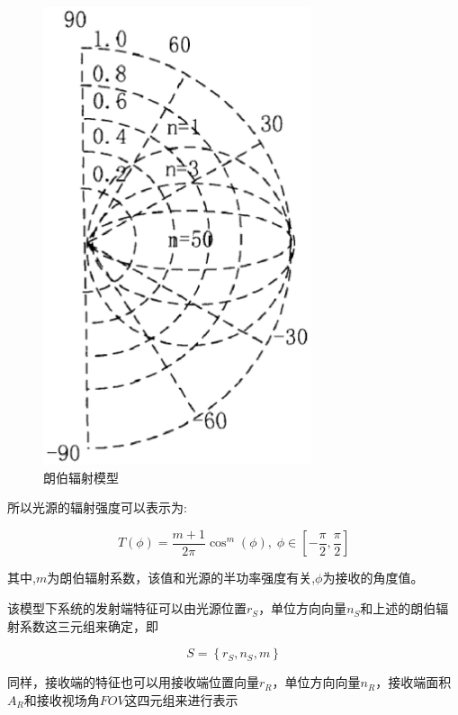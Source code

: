 \begin{figure}[htbp]
    \centering
	\includegraphics[width=0.7\textwidth]{figures/chapter-2/Lambo.eps}
	\caption{朗伯辐射模型}
	\label{fig:lambo}
\end{figure}

所以光源的辐射强度可以表示为:

\begin{equation}
    T(\phi) = \frac{m+1}{2\pi}\cos^m(\phi),\;\phi\in[-\frac{\pi}{2},\frac{\pi}{2}]
\end{equation}

其中,$m$为朗伯辐射系数，该值和光源的半功率强度有关,$\phi$为接收的角度值。

该模型下系统的发射端特征可以由光源位置$r_{S}$，单位方向向量$n_{S}$和上述的朗伯辐射系数这三元组来确定，即

\begin{equation}
    S=\left\{r_{S},n_{S},m\right\}
\end{equation}

同样，接收端的特征也可以用接收端位置向量$r_{R}$，单位方向向量$n_{R}$，接收端面积$A_{R}$和接收视场角$FOV$这四元组来进行表示

